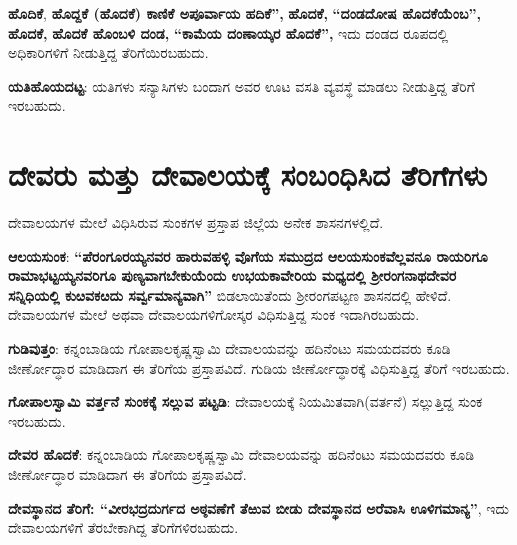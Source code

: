 \textbf{ಹೊದಿಕೆ},\textbf{ ಹೊದ್ದಕೆ (ಹೊದಕೆ) ಕಾಣಿಕೆ ಅಪೂರ್ವಾಯ ಹದಿಕೆ”,}\textbf{ ಹೊದಕೆ,}\textbf{ “ದಂಡದೋಷ\general{\break } ಹೊದಕೆಯೆಂಬ”,}\textbf{ ಹೊದಕೆ,}\textbf{ ಹೊದಕೆ ಹೊಂಬಳಿ ದಂಡ,}\textbf{ “ಕಾಮೆಯ ದಂಣಾಯ್ಕರ ಹೊದಕೆ”,} ಇದು ದಂಡದ ರೂಪದಲ್ಲಿ ಅಧಿಕಾರಿಗಳಿಗೆ ನೀಡುತ್ತಿದ್ದ ತೆರಿಗೆಯಿರಬಹುದು.

\textbf{ಯತಿಹೊಯದಟ್ಟ}: ಯತಿಗಳು ಸನ್ಯಾಸಿಗಳು ಬಂದಾಗ ಅವರ ಊಟ ವಸತಿ ವ್ಯವಸ್ಥೆ ಮಾಡಲು ನೀಡುತ್ತಿದ್ದ ತೆರಿಗೆ ಇರಬಹುದು.

\section{ದೇವರು ಮತ್ತು ದೇವಾಲಯಕ್ಕೆ ಸಂಬಂಧಿಸಿದ ತೆರಿಗೆಗಳು}

ದೇವಾಲಯಗಳ ಮೇಲೆ ವಿಧಿಸಿರುವ ಸುಂಕಗಳ ಪ್ರಸ್ತಾಪ ಜಿಲ್ಲೆಯ ಅನೇಕ ಶಾಸನಗಳಲ್ಲಿದೆ.

\textbf{ಆಲಯಸುಂಕ}: \textbf{“ಪೆರಂಗೂರಯ್ಯನವರ ಹಾರುವಹಳ್ಳಿ ವೊಗೆಯ ಸಮುದ್ರದ ಆಲಯಸುಂಕವೆಲ್ಲವನೂ\general{\break } ರಾಯರಿಗೂ ರಾಮಾಭಟ್ಟಯ್ಯನವರಿಗೂ ಪುಣ್ಯವಾಗಬೇಕುಯೆಂದು ಉಭಯಕಾವೇರಿಯ ಮಧ್ಯದಲ್ಲಿ ಶ‍್ರೀರಂಗನಾಥದೇವರ ಸನ್ನಿಧಿಯಲ್ಲಿ ಕುೞವಕೞದು ಸರ್ವ್ವಮಾನ್ಯವಾಗಿ”} ಬಿಡಲಾಯಿತೆಂದು ಶ‍್ರೀರಂಗಪಟ್ಟಣ ಶಾಸನದಲ್ಲಿ ಹೇಳಿದೆ. ದೇವಾಲಯಗಳ ಮೇಲೆ ಅಥವಾ ದೇವಾಲಯಗಳಿಗೋಸ್ಕರ ವಿಧಿಸುತ್ತಿದ್ದ ಸುಂಕ ಇದಾಗಿರಬಹುದು.

\textbf{ಗುಡಿವುತ್ತಂ}: ಕನ್ನಂಬಾಡಿಯ ಗೋಪಾಲಕೃಷ್ಣಸ್ವಾಮಿ ದೇವಾಲಯವನ್ನು ಹದಿನೆಂಟು ಸಮಯದವರು ಕೂಡಿ ಜೀರ್ಣೋದ್ಧಾರ ಮಾಡಿದಾಗ ಈ ತೆರಿಗೆಯ ಪ್ರಸ್ತಾಪವಿದೆ. ಗುಡಿಯ ಜೀರ್ಣೋದ್ಧಾರಕ್ಕೆ ವಿಧಿಸುತ್ತಿದ್ದ ತೆರಿಗೆ ಇರಬಹುದು.

\textbf{ಗೋಪಾಲಸ್ವಾಮಿ ವರ್ತ್ತನೆ ಸುಂಕಕ್ಕೆ ಸಲ್ಲುವ ಪಟ್ಟಡಿ}: ದೇವಾಲಯಕ್ಕೆ ನಿಯಮಿತವಾಗಿ(ವರ್ತನೆ) ಸಲ್ಲುತ್ತಿದ್ದ ಸುಂಕ ಇರಬಹುದು.

\textbf{ದೇವರ ಹೊದಕೆ}: ಕನ್ನಂಬಾಡಿಯ ಗೋಪಾಲಕೃಷ್ಣಸ್ವಾಮಿ ದೇವಾಲಯವನ್ನು ಹದಿನೆಂಟು ಸಮಯದವರು ಕೂಡಿ ಜೀರ್ಣೋದ್ಧಾರ ಮಾಡಿದಾಗ ಈ ತೆರಿಗೆಯ ಪ್ರಸ್ತಾಪವಿದೆ.

\textbf{ದೇವಸ್ಥಾನದ ತೆರಿಗೆ: “ವೀರಭದ್ರದುರ್ಗದ ಅಠ್ಠವಣೆಗೆ ತೆಱುವ ಬೀಡು ದೇವಸ್ಥಾನದ ಅರೆವಾಸಿ ಊಳಿಗಮಾನ್ಯ”}, ಇದು ದೇವಾಲಯಗಳಿಗೆ ತೆರಬೇಕಾಗಿದ್ದ ತೆರಿಗೆಗಳಿರಬಹುದು.

